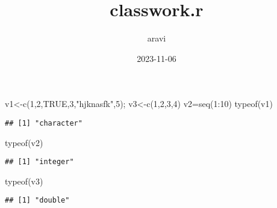 \documentclass[
]{article}
\title{classwork.r}
\author{aravi}
\date{2023-11-06}
\newenvironment{Shaded}{\begin{snugshade}}{\end{snugshade}}
\newcommand{\ConstantTok}[1]{\textcolor[rgb]{0.00,0.00,0.00}{#1}}
\newcommand{\DecValTok}[1]{\textcolor[rgb]{0.00,0.00,0.81}{#1}}
\newcommand{\FunctionTok}[1]{\textcolor[rgb]{0.00,0.00,0.00}{#1}}
\newcommand{\NormalTok}[1]{#1}
\newcommand{\OtherTok}[1]{\textcolor[rgb]{0.56,0.35,0.01}{#1}}
\newcommand{\SpecialCharTok}[1]{\textcolor[rgb]{0.00,0.00,0.00}{#1}}
\newcommand{\StringTok}[1]{\textcolor[rgb]{0.31,0.60,0.02}{#1}}
\begin{document}
\maketitle

\begin{Shaded}
\begin{Highlighting}[]
\NormalTok{v1}\OtherTok{\textless{}{-}}\FunctionTok{c}\NormalTok{(}\DecValTok{1}\NormalTok{,}\DecValTok{2}\NormalTok{,}\ConstantTok{TRUE}\NormalTok{,}\DecValTok{3}\NormalTok{,}\StringTok{"hjknasfk"}\NormalTok{,}\DecValTok{5}\NormalTok{);}
\NormalTok{v3}\OtherTok{\textless{}{-}}\FunctionTok{c}\NormalTok{(}\DecValTok{1}\NormalTok{,}\DecValTok{2}\NormalTok{,}\DecValTok{3}\NormalTok{,}\DecValTok{4}\NormalTok{)}
\NormalTok{v2}\OtherTok{=}\FunctionTok{seq}\NormalTok{(}\DecValTok{1}\SpecialCharTok{:}\DecValTok{10}\NormalTok{)}
\FunctionTok{typeof}\NormalTok{(v1)}
\end{Highlighting}
\end{Shaded}

\begin{verbatim}
## [1] "character"
\end{verbatim}

\begin{Shaded}
\begin{Highlighting}[]
\FunctionTok{typeof}\NormalTok{(v2)}
\end{Highlighting}
\end{Shaded}

\begin{verbatim}
## [1] "integer"
\end{verbatim}

\begin{Shaded}
\begin{Highlighting}[]
\FunctionTok{typeof}\NormalTok{(v3)}
\end{Highlighting}
\end{Shaded}

\begin{verbatim}
## [1] "double"
\end{verbatim}
\end{document}
